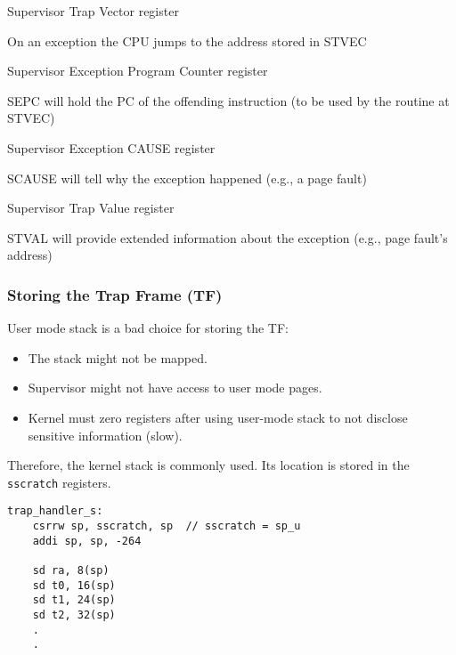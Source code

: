 \newpar{}
 Supervisor Trap Vector register

On an exception the CPU jumps to the address stored in STVEC

\newpar{}
 Supervisor Exception Program Counter register

SEPC will hold the PC of the offending instruction (to be used by the routine at STVEC)

\newpar{}
 Supervisor Exception CAUSE register

SCAUSE will tell why the exception happened (e.g., a page fault)

\newpar{}
 Supervisor Trap Value register

STVAL will provide extended information about the exception (e.g., page fault's address)

\subsubsection{Storing the Trap Frame (TF)}

User mode stack is a bad choice for storing the TF:
\begin{itemize}
    \item The stack might not be mapped.
    \item Supervisor might not have access to user mode pages.
    \item Kernel must zero registers after using user-mode stack to not disclose sensitive information (slow).
\end{itemize}
Therefore, the kernel stack is commonly used. Its location is stored in the \texttt{sscratch} registers.

\newpar{}

\begin{lstlisting}[language={[RISC-V]Assembler}]
trap_handler_s:
	csrrw sp, sscratch, sp  // sscratch = sp_u  
    addi sp, sp, -264
    
	sd ra, 8(sp)
	sd t0, 16(sp)
	sd t1, 24(sp)
	sd t2, 32(sp)
    .
    .
\end{lstlisting}
